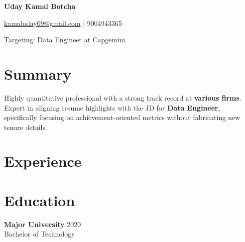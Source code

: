 \documentclass[10pt,a4paper]{article}
\begin{document}
\centerline{\textbf{\huge Uday Kamal Botcha}}
\centerline{\href{mailto:kamaluday09@gmail.com}{kamaluday09@gmail.com} | 9004943365}
\centerline{Targeting: Data Engineer at Capgemini}

\section*{Summary}
Highly quantitative professional with a strong track record at \textbf{various firms}. Expert in aligning resume highlights with the JD for \textbf{Data Engineer}, specifically focusing on achievement-oriented metrics without fabricating new tenure details.

\section*{Experience}


\section*{Education}
\textbf{Major University} \hfill 2020 \\
Bachelor of Technology
\end{document}
